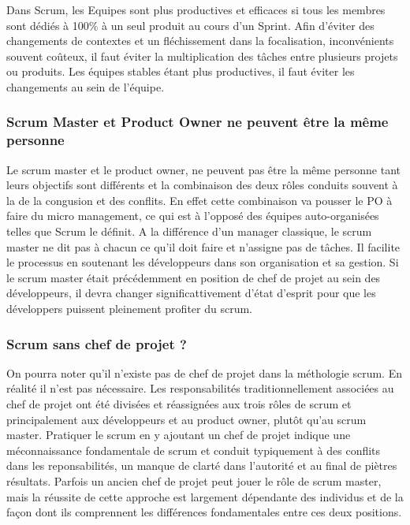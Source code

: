 \begin{description}
 Dans Scrum, les Equipes sont plus productives et efficaces si tous les membres sont
dédiés à 100\% à un seul produit au cours d’un Sprint. Afin d’éviter des changements de contextes et
un fléchissement dans la focalisation, inconvénients souvent coûteux, il faut éviter la multiplication
des tâches entre plusieurs projets ou produits. Les équipes stables étant plus productives, il faut
éviter les changements au sein de l’équipe.

\end{description}

\newpage

\subsubsection{Scrum Master et Product Owner ne peuvent être la même personne}

Le scrum master et le product owner, ne peuvent pas être la même personne tant leurs objectifs sont différents et la combinaison des deux rôles conduits souvent à la de la congusion et des conflits. 
En effet cette combinaison va pousser le PO à faire du micro management, ce qui est à l'opposé des équipes auto-organisées telles que Scrum le définit. 
A la différence d'un manager classique, le scrum master ne dit pas à chacun ce qu'il doit faire et n'assigne pas de tâches. Il facilite le processus en soutenant les développeurs dans son organisation et sa gestion. Si le scrum master était précédemment en position de chef de projet au sein des développeurs, il devra changer significattivement d'état d'esprit pour que les développers puissent pleinement profiter du scrum. 

\subsubsection{Scrum sans chef de projet ?}

On pourra noter qu'il n'existe pas de chef de projet dans la méthologie scrum. En réalité il n'est pas nécessaire. 
Les responsabilités traditionnellement associées au chef de projet ont été divisées et réassignées aux trois rôles de scrum et principalement aux développeurs et au product owner, plutôt qu'au scrum master. 
Pratiquer le scrum en y ajoutant un chef de projet indique une méconnaissance fondamentale de scrum et conduit typiquement à des conflits dans les reponsabilités, un manque de clarté dans l'autorité et au final de piètres résultats. 
Parfois un ancien chef de projet peut jouer le rôle de scrum master, mais la réussite de cette approche est largement dépendante des individus et de la façon dont ils comprennent les différences fondamentales entre ces deux positions.

